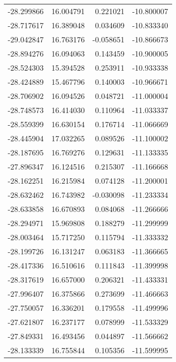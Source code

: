 \begin{tabular}{rrrr}
      -28.299866 &        16.004791 &    0.221021 & -10.800007 \\
      -28.717617 &        16.389048 &    0.034609 & -10.833340 \\
      -29.042847 &        16.763176 &   -0.058651 & -10.866673 \\
      -28.894276 &        16.094063 &    0.143459 & -10.900005 \\
      -28.524303 &        15.394528 &    0.253911 & -10.933338 \\
      -28.424889 &        15.467796 &    0.140003 & -10.966671 \\
      -28.706902 &        16.094526 &    0.048721 & -11.000004 \\
      -28.748573 &        16.414030 &    0.110964 & -11.033337 \\
      -28.559399 &        16.630154 &    0.176714 & -11.066669 \\
      -28.445904 &        17.032265 &    0.089526 & -11.100002 \\
      -28.187695 &        16.769276 &    0.129631 & -11.133335 \\
      -27.896347 &        16.124516 &    0.215307 & -11.166668 \\
      -28.162251 &        16.215984 &    0.074128 & -11.200001 \\
      -28.632462 &        16.743982 &   -0.030098 & -11.233334 \\
      -28.633858 &        16.670893 &    0.084068 & -11.266666 \\
      -28.294971 &        15.969808 &    0.188279 & -11.299999 \\
      -28.003464 &        15.717250 &    0.115794 & -11.333332 \\
      -28.199726 &        16.131247 &    0.063183 & -11.366665 \\
      -28.417336 &        16.510616 &    0.111843 & -11.399998 \\
      -28.317619 &        16.657000 &    0.206321 & -11.433331 \\
      -27.996407 &        16.375866 &    0.273699 & -11.466663 \\
      -27.750057 &        16.336201 &    0.179558 & -11.499996 \\
      -27.621807 &        16.237177 &    0.078999 & -11.533329 \\
      -27.849331 &        16.493456 &    0.044897 & -11.566662 \\
      -28.133339 &        16.755844 &    0.105356 & -11.599995 \\

\end{tabular}
